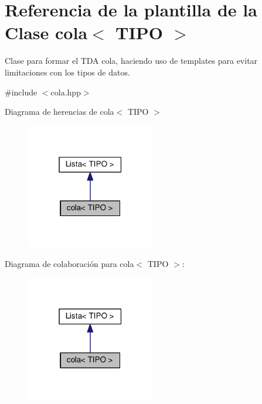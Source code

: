 \hypertarget{classcola}{}\section{Referencia de la plantilla de la Clase cola$<$ T\+I\+PO $>$}
\label{classcola}


Clase para formar el T\+DA cola, haciendo uso de templates para evitar limitaciones con los tipos de datos.  




{\ttfamily \#include $<$cola.\+hpp$>$}



Diagrama de herencias de cola$<$ T\+I\+PO $>$\nopagebreak
\begin{figure}[H]
\begin{center}
\leavevmode
\includegraphics[width=159pt]{classcola__inherit__graph}
\end{center}
\end{figure}


Diagrama de colaboración para cola$<$ T\+I\+PO $>$\+:\nopagebreak
\begin{figure}[H]
\begin{center}
\leavevmode
\includegraphics[width=159pt]{classcola__coll__graph}
\end{center}
\end{figure}
